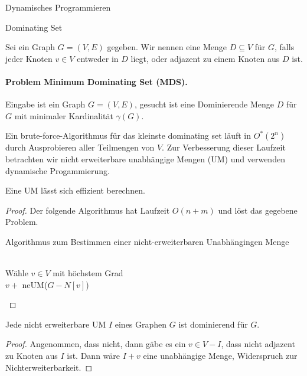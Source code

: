 \begin{chapter}{Dynamisches Programmieren}
\begin{section}{Dominating Set}
  \begin{definition}
   Sei ein Graph \(G = (V,E)\) gegeben. Wir nennen eine Menge \(D \subseteq V\)  für $G$, falls jeder Knoten $v \in V$ entweder in $D$ liegt, oder adjazent zu einem Knoten aus $D$ ist.
  \end{definition}
  \paragraph{Problem Minimum Dominating Set (MDS).} Eingabe ist ein Graph $G=(V,E)$, gesucht ist eine Dominierende Menge $D$ für $G$ mit minimaler Kardinalität $\gamma(G)$.

  Ein brute-force-Algorithmus für das kleinste dominating set läuft in \(O^*(2^n)\) durch Ausprobieren aller Teilmengen von \(V\). Zur Verbesserung dieser Laufzeit betrachten wir nicht erweiterbare unabhängige Mengen (UM) und verwenden dynamische Progammierung. 
  
  \begin{lemma}
   Eine UM lässt sich effizient berechnen.
  \end{lemma}
  \begin{proof}
  Der folgende Algorithmus hat Laufzeit $O(n+m)$ und löst das gegebene Problem. 
  
  \begin{algorithm}[H]
    \caption{Algorithmus zum Bestimmen einer nicht-erweiterbaren Unabhängingen Menge}

     \\
    Wähle $v \in V$ mit höchstem Grad\\
    \Return $v + $ neUM($G-N[v]$)
  \end{algorithm}
  \end{proof}
  
  \begin{lemma}
   Jede nicht erweiterbare UM $I$ eines Graphen $G$ ist dominierend für $G$.
  \end{lemma}
  \begin{proof}
   Angenommen, dass nicht, dann gäbe es ein $v\in V-I$, dass nicht adjazent zu Knoten aus $I$ ist. Dann wäre $I + v$ eine unabhängige Menge, Widerspruch zur Nichterweiterbarkeit.
  \end{proof}


\end{section}
\end{chapter}
